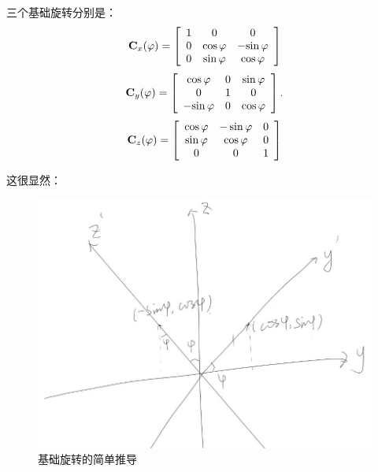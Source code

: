 \documentclass[11pt]{ctexart}
\begin{document}
三个基础旋转分别是：
\begin{equation}
{\bf C}_{x}(\varphi)=\left[\begin{array}{c c c}{{1}}&{{0}}&{{0}}\\ {{0}}&{{\mathrm{cos}\,\varphi}}&{{-\mathrm{sin}\,\varphi}}\\ {{0}}&{{\mathrm{sin}\,\varphi}}&{{\mathrm{cos}\,\varphi}}\end{array}\right]
\end{equation}
\begin{equation}
{\bf C}_{y}(\varphi)=\left[\begin{array}{c c c}{{\mathrm{cos}\,\varphi}}&{{0}}&{{\mathrm{sin}\,\varphi}}\\ {{0}}&{{1}}&{{0}}\\ {{-\mathrm{sin}\,\varphi}}&{{0}}&{{\mathrm{cos}\,\varphi}}\end{array}\right].
\end{equation}
\begin{equation}
{\bf C}_{z}(\varphi)=\left[\begin{array}{c c c}{{\cos\varphi}}&{{-\sin\varphi}}&{{0}}\\ {{\sin\varphi}}&{{\cos\varphi}}&{{0}}\\ {{0}}&{{0}}&{{1}}\end{array}\right]
\end{equation}

这很显然：
\begin{figure}[ht]
    \centering
    \includegraphics[scale=0.75]{images/2.jpg}
    \caption{基础旋转的简单推导}
    \label{label2}
\end{figure}
\end{document}
